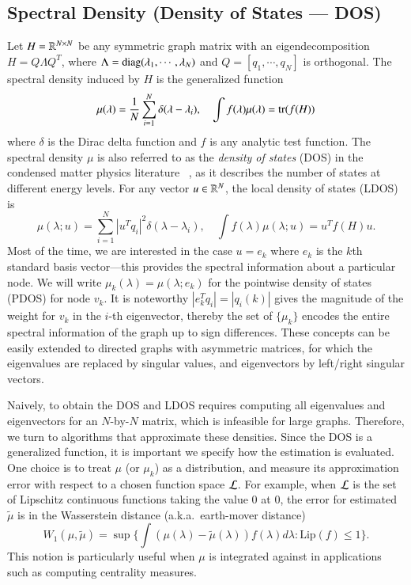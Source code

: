 \subsection{Spectral Density (Density of States --- DOS)}
Let $H = \mathbb{R}^{N\times N}$ be any symmetric graph matrix with an
eigendecomposition $H = Q\Lambda Q^T$, where $\Lambda = \operatorname{diag} 
(\lambda_1,\cdots,\lambda_N)$ and $Q = [q_1,\cdots, q_N]$ is orthogonal. The
spectral density induced by $H$ is the generalized function
\begin{equation}\label{eqn:dos}
  \mu(\lambda) = \frac{1}{N}\sum_{i=1}^N \delta(\lambda - \lambda_i), \quad \int
  f(\lambda) \mu(\lambda) = \operatorname{tr}(f(H))
\end{equation}
where $\delta$ is the Dirac delta function and $f$ is any analytic test
function. The spectral density $\mu$ is also referred to as the \emph{density
of states} (DOS) in the condensed matter physics literature~
\cite{weisse2006kernel}, as it describes the number of states at different
energy levels. For any vector $u\in\mathbb{R}^N$, the local density of states (LDOS)
is
\begin{equation}\label{eqn:ldos}
  \mu(\lambda; u) = \sum_{i=1}^N|u^Tq_i|^2\delta(\lambda-\lambda_i), \quad \int
  f(\lambda)\mu(\lambda; u) = u^T f(H) u.
\end{equation}
Most of the time, we are interested in the case $u=e_k$ where $e_k$ is the $k$th
standard basis vector---this provides the spectral information about a
particular node. We will write $\mu_k(\lambda) = \mu(\lambda; e_k)$ for the
pointwise density of states (PDOS) for node $v_k$. It is noteworthy $|e_k^Tq_i|
= |q_i(k)|$ gives the magnitude of the weight for $v_k$ in the $i$-th
eigenvector, thereby the set of $\{\mu_k\}$ encodes the entire spectral
information of the graph up to sign differences. These concepts can be easily
extended to directed graphs with asymmetric matrices, for which the eigenvalues
are replaced by singular values, and eigenvectors by left/right singular
vectors.

Naively, to obtain the DOS and LDOS requires computing all eigenvalues and
eigenvectors for an $N$-by-$N$ matrix, which is infeasible for large graphs.
Therefore, we turn to algorithms that approximate these densities. Since the DOS
is a generalized function, it is important we specify how the estimation is
evaluated. One choice is to treat $\mu$ (or $\mu_k$) as a distribution, and
measure its  approximation error with respect to a chosen function space
$\mathcal{L}$. For  example, when $\mathcal{L}$ is the set of Lipschitz continuous functions
taking the value 0 at 0, the error for estimated $\widetilde{\mu}$ is in the
Wasserstein distance (a.k.a.\ earth-mover distance)~\cite{kantorovich1958space}
\begin{equation}\label{eqn:waisserstein}
W_1(\mu,\widetilde{\mu}) = \sup\Big\{\int (\mu(\lambda)-\widetilde{\mu}(\lambda
))f(\lambda)d\lambda : \text{Lip}(f)\leq 1\Big\}.
\end{equation}
This notion is particularly useful when $\mu$ is integrated against in 
applications such as computing centrality measures.

